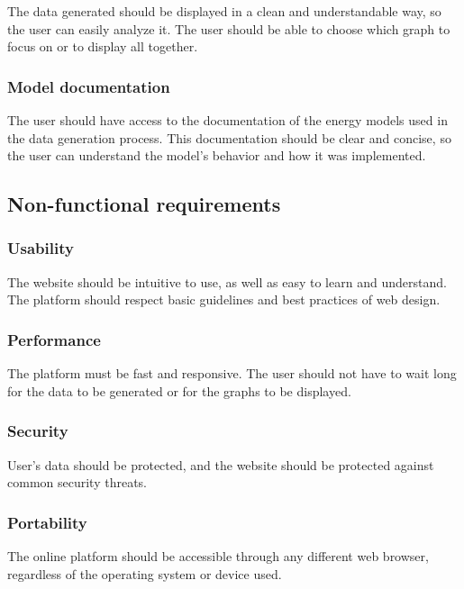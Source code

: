         The data generated should be displayed in a clean and understandable way, so the user can easily analyze it. The user should be able to choose which graph to focus on or to display all together.

    \subsubsection{Model documentation}

        The user should have access to the documentation of the energy models used in the data generation process. This documentation should be clear and concise, so the user can understand the model's behavior and how it was implemented.

\subsection{Non-functional requirements}

    \subsubsection{Usability}
    
        The website should be intuitive to use, as well as easy to learn and understand. The platform should respect basic guidelines and best practices of web design.

    \subsubsection{Performance}

        The platform must be fast and responsive. The user should not have to wait long for the data to be generated or for the graphs to be displayed.

    \subsubsection{Security}

        User's data should be protected, and the website should be protected against common security threats.

    \subsubsection{Portability}

        The online platform should be accessible through any different web browser, regardless of the operating system or device used.

